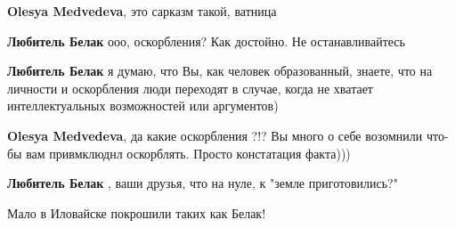 \begin{itemize}
\begin{itemize}
\textbf{Olesya Medvedeva}, это сарказм такой, ватница

 
\textbf{Любитель Белак} ооо, оскорбления? Как достойно. Не останавливайтесь

 
\textbf{Любитель Белак} я думаю, что Вы, как человек образованный, знаете, что
на личности и оскорбления люди переходят в случае, когда не хватает
интеллектуальных возможностей или аргументов)

 
\textbf{Olesya Medvedeva}, да какие оскорбления ?!? Вы много о себе возомнили что-бы вам привмклюднл оскорблять. Просто констатация факта)))

 
\textbf{Любитель Белак} , ваши друзья, что на нуле, к "земле приготовились?"

 
Мало в Иловайске покрошили таких как Белак!

 

\end{itemize}
\end{itemize}

